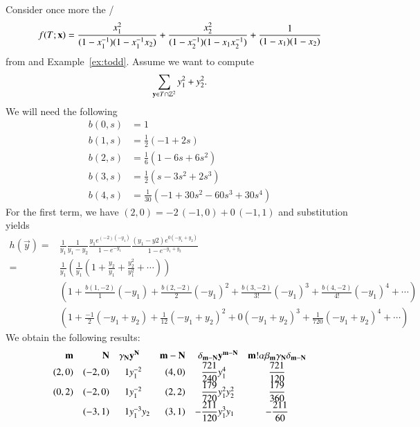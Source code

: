 \begin{example}
\label{ex:laurent:old}
Consider once more the \rgf/
$$
\f T x =
\frac{x_1^2}{(1-x_1^{-1})(1-x_1^{-1}x_2)}
+
\frac{x_2^2}{(1-x_2^{-1})(1-x_1 x_2^{-1})}
+
\frac1{(1-x_1)(1-x_2)}
$$
from 
and Example~\ref{ex:todd}.
Assume we want to compute
$$
\sum_{\vec y \in T\cap \ZZ^2} y_1^2 + y_2^2
.
$$
We will need the following 
\begin{align*}
b(0,s) & = 1
\\
b(1,s) &= \frac 1 2 \left(-1 + 2 s \right)
\\
b(2,s) &= \frac 1 6 \left(1 -6 s + 6 s^2 \right)
\\
b(3,s) &= \frac 1 2 \left(s -3 s^2 + 2 s^3\right)
\\
b(4,s) & = \frac 1{30} \left(-1 + 30 s^2 -60 s^3 + 30 s^4\right)
\end{align*}
For the first term, we have $(2,0) = -2 \, (-1,0) + 0 \, (-1, 1)$
and substitution yields
\begin{align*}
h(\vec y)
=&
\frac 1{y_1}
\frac 1{y_1-y_2}
\frac {y_1 e^{(-2)(-y_1)}}{1-e^{-y_1}}
\frac {(y_1-y2) e^{0(-y_1+y_2)}}{1-e^{-y_1+y_2}}
\\
=&
\frac 1{y_1}
\left(
    \frac 1{y_1} \left(
		1 + \frac{y_2}{y_1} + \frac{y_2^2}{y_1^2} + \cdots
	\right)
\right)
\\
&
\left(
1 + \frac{b(1,-2)}1 (-y_1) + \frac{b(2,-2)}2 (-y_1)^2
	+ \frac{b(3,-2)}{3!} (-y_1)^3 + \frac{b(4,-2)}{4!} (-y_1)^4 + \cdots
\right)
\\
&
\left(
1 + \frac{-1}2 (-y_1+y_2) + \frac{1}{12} (-y_1+y_2)^2
	+ 0 (-y_1+y_2)^3
	+ \frac{1}{720} (-y_1+y_2)^4 + \cdots
\right)
\end{align*}
We obtain the following results:
{\renewcommand\arraystretch{2}
$$
\begin{array}{rrr@{}lrr@{}lc}
\vec m & \vec N & \gamma_{\vec N} & \vec y^{\vec N} &
\vec m - \vec N & \delta_{\vec m - \vec N} & \vec y^{\vec m - \vec N} &
\vec m! \alpha \beta_{\vec m} \gamma_{\vec N} \delta_{\vec m - \vec N}
\\
(2,0) & (-2,0) & 1 & y_1^{-2} & (4,0)
		& \displaystyle\frac{721}{240} & y_1^4
		& \displaystyle\frac{721}{120}
\\
(0,2) & (-2,0) & 1 & y_1^{-2} & (2,2)
		& \displaystyle\frac{179}{720} & y_1^2 y_2^2
		& \displaystyle\frac{179}{360}
\\
      & (-3,1) & 1 & y_1^{-3} y_2 & (3,1)
		& \displaystyle-\frac{211}{120} & y_1^3 y_1
		& \displaystyle-\frac{211}{60}

\end{array}$$}
\end{example}
